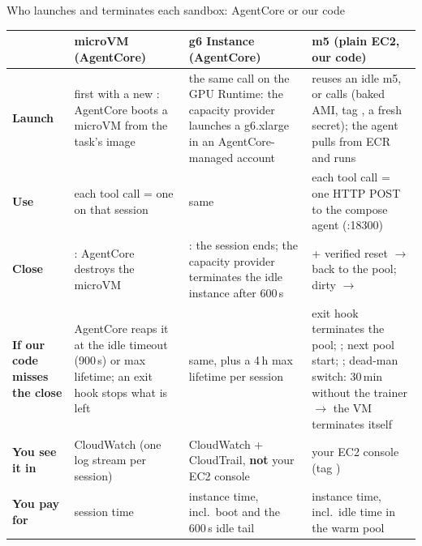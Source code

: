\begin{frame}{Who launches and terminates each sandbox: AgentCore or our code}
\tiny\setlength{\tabcolsep}{3pt}
\begin{tabularx}{\textwidth}{@{}P{0.11\textwidth}YYY@{}}
\toprule
& \textbf{\textcolor{cat2}{microVM}} (AgentCore) & \textbf{\textcolor{cat3}{g6 Instance}} (AgentCore) & \textbf{\textcolor{cat1}{m5}} (plain EC2, \textbf{our code})\\
\midrule
\textbf{Launch} & first  with a new : AgentCore boots a microVM from the task's image & the same call on the GPU Runtime: the capacity provider launches a g6.xlarge in an AgentCore-managed account &  reuses an idle m5, or calls  (baked AMI, tag , a fresh secret); the agent pulls from ECR and runs \\
\textbf{Use} & each tool call = one  on that session & same & each tool call = one HTTP POST to the compose agent (:18300)\\
\textbf{Close} & : AgentCore destroys the microVM & : the session ends; the capacity provider terminates the idle instance after 600\,s &  + verified reset $\rightarrow$ back to the pool; dirty $\rightarrow$ \\
\textbf{If our code misses the close} & AgentCore reaps it at the idle timeout (900\,s) or max lifetime; an exit hook stops what is left & same, plus a 4\,h max lifetime per session & exit hook terminates the pool;  ; next pool start; ; dead-man switch: 30\,min without the trainer $\rightarrow$ the VM terminates itself\\
\textbf{You see it in} & CloudWatch (one log stream per session) & CloudWatch + CloudTrail, \textbf{not} your EC2 console & your EC2 console (tag )\\
\textbf{You pay for} & session time & instance time, incl.\ boot and the 600\,s idle tail & instance time, incl.\ idle time in the warm pool\\
\bottomrule
\end{tabularx}
\par\vspace{2mm}

\end{frame}

